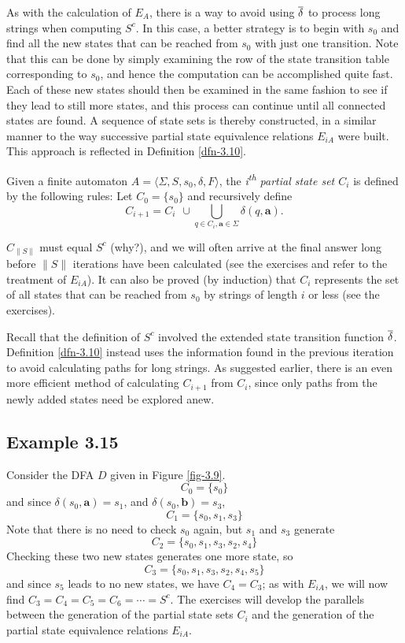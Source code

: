 As with the calculation of $E_A$, there is a way to avoid using $\overline{\delta}$ to
process long strings when computing $S^c$. In this case, a better strategy is to
begin with $s_0$ and find all the new states that can be reached from $s_0$ with
just one transition. Note that this can be done by simply examining the row of
the state transition table corresponding to $s_0$, and hence the computation can
be accomplished quite fast. Each of these new states should then be examined in
the same fashion to see if they lead to still more states, and this process can
continue until all connected states are found. A sequence of state sets is
thereby constructed, in a similar manner to the way successive partial state
equivalence relations $E_{iA}$ were built. This approach is reflected in
Definition \ref{dfn-3.10}.

\begin{dfn}\label{dfn-3.10}
Given a finite automaton $A=\langle\Sigma,S,s_0,\delta,F\rangle$, the 
\emph{i\textsuperscript{th} partial state set $C_i$} is defined by the following rules:
Let $C_0=\{s_0\}$ and recursively define
\[C_{i+1} = C_i \ \ \cup \bigcup\limits_{q\in C_i, \pmb{a}\in\Sigma} \delta(q,\pmb{a}).\]
\end{dfn}

$C_{\|S\|}$ must equal $S^c$ (why?), and we will often arrive at the final answer
long before $\|S\|$ iterations have been calculated (see the exercises and refer
to the treatment of $E_{iA}$). It can also be proved (by induction) that $C_i$
represents the set of all states that can be reached from $s_0$ by strings of
length $i$ or less (see the exercises).

Recall that the definition of $S^c$ involved the extended state transition
function $\overline{\delta}$. Definition \ref{dfn-3.10} instead uses the information found in the
previous iteration to avoid calculating paths for long strings. As suggested
earlier, there is an even more efficient method of calculating $C_{i+1}$ from
$C_i$, since only paths from the newly added states need be explored anew.

\subsection*{Example 3.15}

Consider the DFA $D$ given in Figure \ref{fig-3.9}.
\[ C_0= \{s_0\} \]
and since $\delta(s_0,\pmb{a}) = s_1$, and $\delta(s_0,\pmb{b}) = s_3$,
\[ C_1 =\{s_0,s_1,s_3\} \]
Note that there is no need to check $s_0$ again, but $s_1$ and $s_3$ generate
\[ C_2 = \{s_0,s_1,s_3,s_2,s_4\} \]
Checking these two new states generates one more state, so
\[ C_3=\{s_0,s_1,s_3,s_2,s_4,s_5\} \]
and since $s_5$ leads to no new states, we have $C_4=C_3$; as with $E_{iA}$, we
will now find $C_3=C_4=C_5=C_6=\cdots=S^c$. The exercises will develop the
parallels between the generation of the partial state sets $C_i$ and the
generation of the partial state equivalence relations $E_{iA}$.


